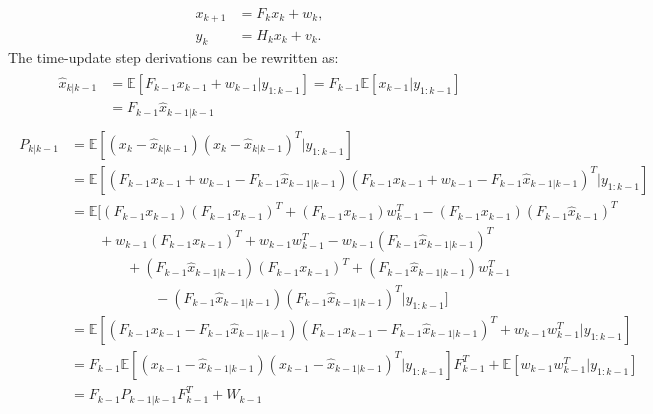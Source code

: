 \documentclass[12pt]{article}
\begin{document}
\begin{enumerate}[label=\arabic*)]
        \begin{subequations}
        \begin{align}
            x_{k+1} &= F_k x_k + w_k, \\
            y_k &= H_k x_k + v_k.
        \end{align}
        \end{subequations}
        The time-update step derivations can be rewritten as:
        \begin{align} \label{eq:linG1}
        \begin{split}
            \hat x_{k|k-1} &= \mathbb E[ F_{k-1} x_{k-1} + w_{k-1} |y_{1:k-1}] = F_{k-1} \mathbb E[ x_{k-1} |y_{1:k-1}] \\
            &= F_{k-1} \hat x_{k-1|k-1}
        \end{split}
        \end{align}
        \begin{align} \label{eq:linG2}
        \begin{split}
            P_{k|k-1} &=  \mathbb E[(x_k-\hat x_{k|k-1})(x_k-\hat x_{k|k-1})^T|y_{1:k-1}] \\
            &= \mathbb E[ ( F_{k-1} x_{k-1} + w_{k-1}- F_{k-1} \hat x_{k-1|k-1})( F_{k-1} x_{k-1} + w_{k-1}- F_{k-1} \hat x_{k-1|k-1})^T|y_{1:k-1}] \\
            &= \mathbb E[ ( F_{k-1} x_{k-1} ) ( F_{k-1} x_{k-1} )^T + ( F_{k-1} x_{k-1} ) w^T_{k-1} - ( F_{k-1} x_{k-1} ) ( F_{k-1} \hat x_{k-1} )^T \\
            & \qquad  + w_{k-1} ( F_{k-1} x_{k-1} )^T + w_{k-1} w^T_{k-1} - w_{k-1} ( F_{k-1} \hat x_{k-1|k-1} )^T  \\ & \qquad \qquad + ( F_{k-1} \hat x_{k-1|k-1} ) (F_{k-1} x_{k-1})^T 
            + ( F_{k-1} \hat x_{k-1|k-1} ) w^T_{k-1} \\ & \qquad \qquad \qquad- ( F_{k-1} \hat x_{k-1|k-1} ) ( F_{k-1} \hat x_{k-1|k-1} )^T|y_{1:k-1}] \\
            &= \mathbb E[ ( F_{k-1} x_{k-1} - F_{k-1} \hat x_{k-1|k-1} ) ( F_{k-1} x_{k-1} - F_{k-1} \hat x_{k-1|k-1} )^T + w_{k-1} w^T_{k-1}|y_{1:k-1}] \\
            &= F_{k-1} \mathbb E[(x_{k-1}-\hat x_{k-1|k-1})(x_{k-1}-\hat x_{k-1|k-1})^T |y_{1:k-1}] F^T_{k-1} + \mathbb E[w_{k-1} w^T_{k-1} |y_{1:k-1}] \\
            &= F_{k-1} P_{k-1|k-1} F^T_{k-1} + W_{k-1}
        \end{split}
        \end{align}

\end{enumerate}
\end{document}
